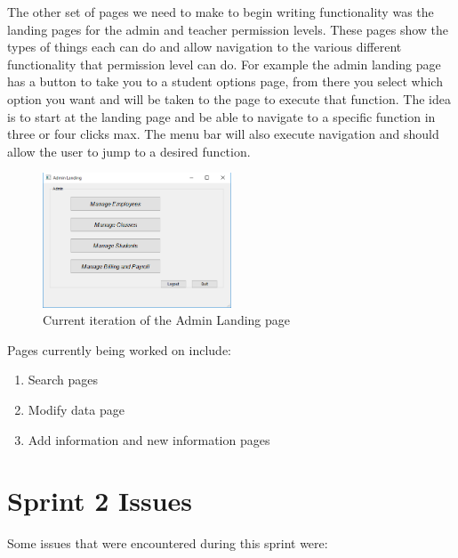 \documentclass[11pt]{book}
\begin{document}
The other set of pages we need to make to begin writing functionality was the landing pages for the admin and teacher permission levels. These pages show the types of things each can do and allow navigation to the various different functionality that permission level can do. For example the admin landing page has a button to take you to a student options page, from there you select which option you want and will be taken to the page to execute that function. The idea is to start at the landing page and be able to navigate to a specific function in three or four clicks max. The menu bar will also execute navigation and should allow the user to jump to a desired function.\\

\begin{figure}
\caption{Current iteration of the Admin Landing page}
\centering
\includegraphics[width=0.5\textwidth]{admin_landing}
\end{figure}

Pages currently being worked on include:

\begin{enumerate}
\item Search pages
\item Modify data page
\item Add information and new information pages
\end{enumerate}


\section{Sprint 2 Issues}
Some issues that were encountered during this sprint were:
\end{document}
